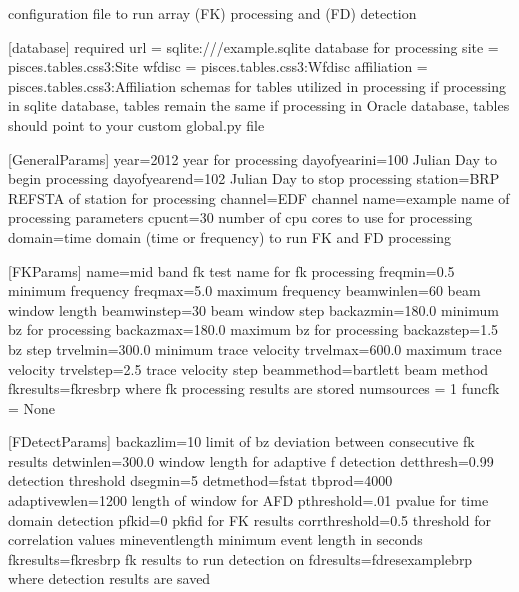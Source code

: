 \documentclass[letterpaper,10pt,english]{sphinxmanual}
\begin{document}
\begin{sphinxVerbatim}[commandchars=\\\{\}]
\PYGZsh{} configuration file to run array (FK) processing and (FD) detection

[database] \PYGZsh{} required
url = sqlite:///example.sqlite
\PYGZsh{} database for processing
site = pisces.tables.css3:Site
wfdisc = pisces.tables.css3:Wfdisc
affiliation = pisces.tables.css3:Affiliation
\PYGZsh{} schemas for tables utilized in processing
\PYGZsh{} if processing in sqlite database, tables remain the same
\PYGZsh{} if processing in Oracle database, tables should point to your custom global\PYGZus{}.py file

[GeneralParams]
year=2012
\PYGZsh{} year for processing
dayofyearini=100
\PYGZsh{} Julian Day to begin processing
dayofyearend=102
\PYGZsh{} Julian Day to stop processing
station=BRP
\PYGZsh{} REFSTA of station for processing
channel=EDF
\PYGZsh{} channel
name=example
\PYGZsh{} name of processing parameters
cpucnt=30
\PYGZsh{} number of cpu cores to use for processing
domain=time
\PYGZsh{} domain (time or frequency) to run FK and FD processing


[FKParams]
name=mid band fk test
\PYGZsh{} name for fk processing
freqmin=0.5
\PYGZsh{} minimum frequency
freqmax=5.0
\PYGZsh{} maximum frequency
beamwinlen=60
\PYGZsh{} beam window length
beamwinstep=30
\PYGZsh{} beam window step
backazmin=\PYGZhy{}180.0
\PYGZsh{} minimum bz for processing
backazmax=180.0
\PYGZsh{} maximum bz for processing
backazstep=1.5
\PYGZsh{} bz step
trvelmin=300.0
\PYGZsh{} minimum trace velocity
trvelmax=600.0
\PYGZsh{} maximum trace velocity
trvelstep=2.5
\PYGZsh{} trace velocity step
beammethod=bartlett
\PYGZsh{} beam method
fkresults=fk\PYGZus{}res\PYGZus{}brp
\PYGZsh{} where fk processing results are stored
numsources = 1
func\PYGZus{}fk = None

[FDetectParams]
back\PYGZus{}az\PYGZus{}lim=10
\PYGZsh{} limit of bz deviation between consecutive fk results
detwinlen=300.0
\PYGZsh{} window length for adaptive f detection
detthresh=0.99
\PYGZsh{} detection threshold
dsegmin=5
detmethod=fstat
tb\PYGZus{}prod=4000
adaptivewlen=1200
\PYGZsh{}length of window for AFD
pthreshold=.01
\PYGZsh{}p\PYGZhy{}value for time domain detection
pfkid=0
\PYGZsh{} pkfid for FK results
corrthreshold=0.5
\PYGZsh{} threshold for correlation values
mineventlength
\PYGZsh{} minimum event length in seconds
fkresults=fk\PYGZus{}res\PYGZus{}brp
\PYGZsh{} fk results to run detection on
fdresults=fd\PYGZus{}res\PYGZus{}example\PYGZus{}brp
\PYGZsh{} where detection results are saved




\end{sphinxVerbatim}
\end{document}
